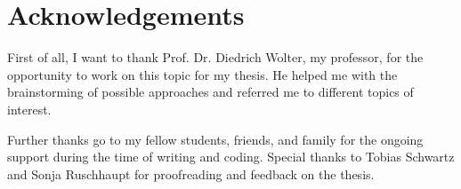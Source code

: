 %
\section{Acknowledgements}\label{sec:acknowledgements}
%
First of all, I want to thank Prof. Dr. Diedrich Wolter, my professor, for the opportunity to work on this topic for my thesis. He helped me with the brainstorming of possible approaches and referred me to different topics of interest.

Further thanks go to my fellow students, friends, and family for the ongoing support during the time of writing and coding. Special thanks to Tobias Schwartz and Sonja Ruschhaupt for proofreading and feedback on the thesis.
